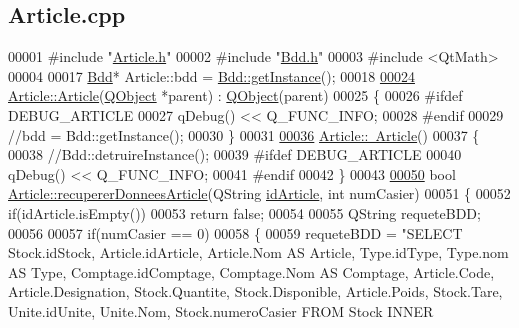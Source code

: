 \hypertarget{_article_8cpp_source}{}\subsection{Article.\+cpp}
\label{_article_8cpp_source}

\begin{DoxyCode}
00001 \textcolor{preprocessor}{#include "\hyperlink{_article_8h}{Article.h}"}
00002 \textcolor{preprocessor}{#include "\hyperlink{_bdd_8h}{Bdd.h}"}
00003 \textcolor{preprocessor}{#include <QtMath>}
00004 
00017 \hyperlink{class_bdd}{Bdd}* Article::bdd = \hyperlink{class_bdd_a6f55c29d593da12ca31fad02f5adfe24}{Bdd::getInstance}();
00018 
\hyperlink{class_article_a27b5b7af25138f7a465215be3a9deca4}{00024} \hyperlink{class_article_a27b5b7af25138f7a465215be3a9deca4}{Article::Article}(\hyperlink{class_q_object}{QObject} *parent) : \hyperlink{class_q_object}{QObject}(parent)
00025 \{
00026 \textcolor{preprocessor}{    #ifdef DEBUG\_ARTICLE}
00027         qDebug() << Q\_FUNC\_INFO;
00028 \textcolor{preprocessor}{    #endif}
00029     \textcolor{comment}{//bdd = Bdd::getInstance();}
00030 \}
00031 
\hyperlink{class_article_a5c429e49b30104b1069044d0e1a6aa1a}{00036} \hyperlink{class_article_a5c429e49b30104b1069044d0e1a6aa1a}{Article::~Article}()
00037 \{
00038     \textcolor{comment}{//Bdd::detruireInstance();}
00039 \textcolor{preprocessor}{    #ifdef DEBUG\_ARTICLE}
00040         qDebug() << Q\_FUNC\_INFO;
00041 \textcolor{preprocessor}{    #endif}
00042 \}
00043 
\hyperlink{class_article_ae657464da12790b763659ca98a948f50}{00050} \textcolor{keywordtype}{bool} \hyperlink{class_article_ae657464da12790b763659ca98a948f50}{Article::recupererDonneesArticle}(QString 
      \hyperlink{class_article_a9f2f7a04139f26accec145066a5aacae}{idArticle}, \textcolor{keywordtype}{int} numCasier)
00051 \{
00052     \textcolor{keywordflow}{if}(idArticle.isEmpty())
00053         \textcolor{keywordflow}{return} \textcolor{keyword}{false};
00054 
00055     QString requeteBDD;
00056 
00057     \textcolor{keywordflow}{if}(numCasier == 0)
00058     \{
00059         requeteBDD = \textcolor{stringliteral}{"SELECT Stock.idStock, Article.idArticle, Article.Nom AS Article, Type.idType,
       Type.nom AS Type, Comptage.idComptage, Comptage.Nom AS Comptage, Article.Code, Article.Designation, Stock.Quantite,
       Stock.Disponible, Article.Poids, Stock.Tare, Unite.idUnite, Unite.Nom, Stock.numeroCasier FROM Stock INNER
}
\end{DoxyCode}
